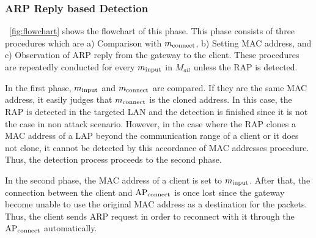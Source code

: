 \documentclass[conference]{IEEEtran}
\newcommand{\tarAP}{\rm AP_{connect}}
\newcommand{\tarMAC}{m_{\rm connect}}
\newcommand{\inputMAC}{m_{\rm input}}
\begin{document}
\subsubsection{ARP Reply based Detection}
\figurename~\ref{fig:flowchart} shows the flowchart of this phase.
This phase consists of three procedures which are a) Comparison with $\tarMAC$, b) Setting MAC address, and c) Observation of ARP reply from the gateway to the client.
These procedures are repeatedly conducted for every $\inputMAC$  in $M_{all}$ unless the RAP is detected.

In the first phase, $\inputMAC$ and $\tarMAC$ are compared.
If they are the same MAC address, it easily judges that $\tarMAC$ is the cloned address.
In this case, the RAP is detected in the targeted LAN and the detection is finished since it is not the case in non attack scenario.
However, in the case where the RAP clones a MAC address of a LAP beyond the communication range of a client or it does not clone, it cannot be detected by this accordance of MAC addresses procedure.
Thus, the detection process proceeds to the second phase.

In the second phase, the MAC address of a client is set to $\inputMAC$.
After that, the connection between the client and $\tarAP$ is once lost since the gateway become unable to use the original MAC address as a destination for the packets.
Thus, the client sends ARP request in order to reconnect with it through the $\tarAP$ automatically.
\end{document}
